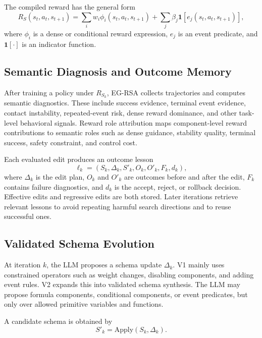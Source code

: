 \documentclass[11pt]{article}
\begin{document}
The compiled reward has the general form
\begin{equation}
R_S(s_t,a_t,s_{t+1})
=
\sum_i w_i \phi_i(s_t,a_t,s_{t+1})
+
\sum_j \beta_j \mathbf{1}[e_j(s_t,a_t,s_{t+1})],
\end{equation}
where $\phi_i$ is a dense or conditional reward expression, $e_j$ is an event predicate, and $\mathbf{1}[\cdot]$ is an indicator function.

\subsection{Semantic Diagnosis and Outcome Memory}

After training a policy under $R_{S_k}$, EG-RSA collects trajectories and computes semantic diagnostics. These include success evidence, terminal event evidence, contact instability, repeated-event risk, dense reward dominance, and other task-level behavioral signals. Reward role attribution maps component-level reward contributions to semantic roles such as dense guidance, stability quality, terminal success, safety constraint, and control cost.

Each evaluated edit produces an outcome lesson
\begin{equation}
\ell_k = (S_k,\Delta_k,S'_k,O_k,O'_k,F_k,d_k),
\end{equation}
where $\Delta_k$ is the edit plan, $O_k$ and $O'_k$ are outcomes before and after the edit, $F_k$ contains failure diagnostics, and $d_k$ is the accept, reject, or rollback decision. Effective edits and regressive edits are both stored. Later iterations retrieve relevant lessons to avoid repeating harmful search directions and to reuse successful ones.

\subsection{Validated Schema Evolution}

At iteration $k$, the LLM proposes a schema update $\Delta_k$. V1 mainly uses constrained operators such as weight changes, disabling components, and adding event rules. V2 expands this into validated schema synthesis. The LLM may propose formula components, conditional components, or event predicates, but only over allowed primitive variables and functions.

A candidate schema is obtained by
\begin{equation}
S'_k = \mathrm{Apply}(S_k,\Delta_k).
\end{equation}
\end{document}
